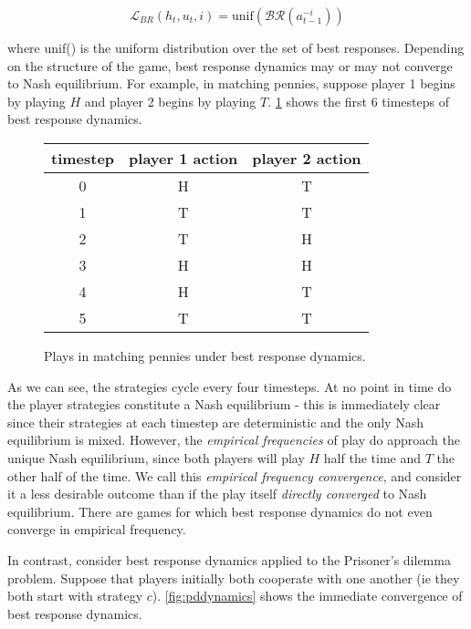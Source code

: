 \begin{equation}
    \mathcal{L}_{BR}(h_t, u_t, i) = \text{unif}\left(\mathcal{BR}(a^{-i}_{t-1})\right)
\end{equation}

where unif() is the uniform distribution over the set of best responses. Depending on the structure of the game, best response dynamics may or may not converge to Nash equilibrium. For example, in matching pennies, suppose player 1 begins by playing $H$ and player 2 begins by playing $T$. \ref{fig:mpdynamic} shows the first 6 timesteps of best response dynamics.

\begin{figure}
\begin{center}
 \begin{tabular}{||c c c||} 
 \hline
 timestep & player 1 action & player 2 action \\ [0.5ex] 
 \hline\hline
 0 & H & T \\ 
 \hline
 1 & T & T \\ 
 \hline
 2 & T & H \\
 \hline
 3 & H & H \\
 \hline
 4 & H & T \\
 \hline
 5 & T & T  \\ [1ex] 
 \hline
\end{tabular}
\end{center}
\caption{Plays in matching pennies under best response dynamics.}
\label{fig:mpdynamic}
\end{figure}

As we can see, the strategies cycle every four timesteps. At no point in time do the player strategies constitute a Nash equilibrium - this is immediately clear since their strategies at each timestep are deterministic and the only Nash equilibrium is mixed. However, the {\em empirical frequencies} of play do approach the unique Nash equilibrium, since both players will play $H$ half the time and $T$ the other half of the time. We call this {\em empirical frequency convergence}, and consider it a less desirable outcome than if the play itself {\em directly converged} to Nash equilibrium. There are games for which best response dynamics do not even converge in empirical frequency.

In contrast, consider best response dynamics applied to the Prisoner's dilemma problem. Suppose that players initially both cooperate with one another (ie they both start with strategy $c$). \ref{fig:pddynamics} shows the immediate convergence of best response dynamics.

